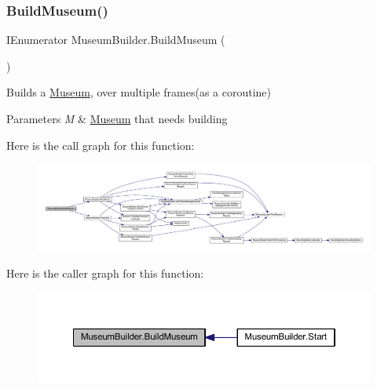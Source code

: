\mbox{\label{class_museum_builder_a604746b8b55c6d423336f44894063244}} 
\subsubsection{\texorpdfstring{Build\+Museum()}{BuildMuseum()}}
{\footnotesize\ttfamily I\+Enumerator Museum\+Builder.\+Build\+Museum (\begin{DoxyParamCaption}{ }\end{DoxyParamCaption})\hspace{0.3cm}{\ttfamily [private]}}



Builds a \mbox{\hyperlink{class_museum}{Museum}}, over multiple frames(as a coroutine) 


\begin{DoxyParams}{Parameters}
{\em M} & \mbox{\hyperlink{class_museum}{Museum}} that needs building\\
\hline
\end{DoxyParams}
Here is the call graph for this function\+:
\nopagebreak
\begin{figure}[H]
\begin{center}
\leavevmode
\includegraphics[width=350pt]{class_museum_builder_a604746b8b55c6d423336f44894063244_cgraph}
\end{center}
\end{figure}
Here is the caller graph for this function\+:
\nopagebreak
\begin{figure}[H]
\begin{center}
\leavevmode
\includegraphics[width=350pt]{class_museum_builder_a604746b8b55c6d423336f44894063244_icgraph}
\end{center}
\end{figure}
\mbox{\label{class_museum_builder_acd17822c3c2fdc7552e94dd1627586a7}} 
